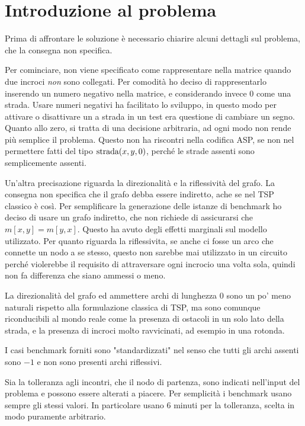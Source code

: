 \documentclass[12pt, a4paper]{article}
\begin{document}
\newpage

\tableofcontents

\newpage

\section{Introduzione al problema}

Prima di affrontare le soluzione è necessario chiarire alcuni dettagli sul problema, che la consegna non specifica.

Per cominciare, non viene specificato come rappresentare nella matrice quando due incroci \emph{non} sono collegati. Per comodità ho deciso di rappresentarlo inserendo un numero negativo nella matrice, e considerando invece $0$ come una strada.
Usare numeri negativi ha facilitato lo sviluppo, in questo modo per attivare o disattivare un a strada in un test era questione di cambiare un segno. Quanto allo zero, si tratta di una decisione arbitraria, ad ogni modo non rende più semplice il problema.
Questo non ha riscontri nella codifica ASP, se non nel permettere fatti del tipo $\text{\lstinline{strada}}(x,y,0)$, perché le strade assenti sono semplicemente assenti.

Un'altra precisazione riguarda la direzionalità e la riflessività del grafo. La consegna non specifica che il grafo debba essere indiretto, ache se nel TSP classico è così.
Per semplificare la generazione delle istanze di benchmark ho deciso di usare un grafo indiretto, che non richiede di assicurarsi che $m[x,y]=m[y,x]$. Questo ha avuto degli effetti marginali sul modello utilizzato.
Per quanto riguarda la riflessivita, se anche ci fosse un arco che connette un nodo a se stesso, questo non sarebbe mai utilizzato in un circuito perché violerebbe il requisito di attraversare ogni incrocio una volta sola, quindi non fa differenza che siano ammessi o meno.

La direzionalità del grafo ed ammettere archi di lunghezza $0$ sono un po' meno naturali rispetto alla formulazione classica di TSP, ma sono comunque riconducibili al mondo reale come la presenza di ostacoli in un solo lato della strada, e la presenza di incroci molto ravvicinati, ad esempio in una rotonda.

I casi benchmark forniti sono "standardizzati" nel senso che tutti gli archi assenti sono $-1$ e non sono presenti archi riflessivi.

Sia la tolleranza agli incontri, che il nodo di partenza, sono indicati nell'input del problema e possono essere alterati a piacere. Per semplicità i benchmark usano sempre gli stessi valori. In particolare usano $6$ minuti per la tolleranza, scelta in modo puramente arbitrario.
\end{document}
